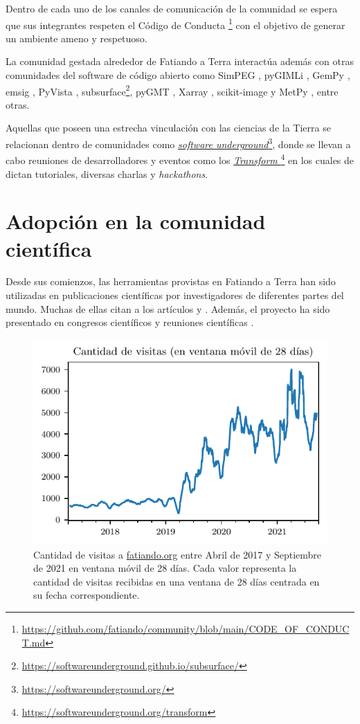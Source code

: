 Dentro de cada uno de los canales de comunicación de la comunidad se espera
que sus integrantes respeten el Código de
Conducta%
\footnote{%
    \url{https://github.com/fatiando/community/blob/main/CODE_OF_CONDUCT.md}%
}
con el objetivo de generar un ambiente ameno y respetuoso.

La comunidad gestada alrededor de Fatiando a Terra interactúa además con otras
comunidades del software de código abierto como SimPEG \citep{cockett2015},
pyGIMLi \citep{ruecker2017}, GemPy \citep{varga2019}, emsig
\citep{werthmuller2017,werthmuller2019}, PyVista \citep{sullivan2019},
subsurface\footnote{\url{https://softwareunderground.github.io/subsurface/}},
pyGMT \citep{pygmt2020}, Xarray \citep{xarray2017}, scikit-image
\citep{skimage} y MetPy \citep{metpy}, entre otras.

Aquellas que poseen una estrecha vinculación con las ciencias de la Tierra
se relacionan dentro de comunidades como
\href{https://softwareunderground.org/}{\emph{software
underground}}\footnote{\url{https://softwareunderground.org/}}, donde se
llevan a cabo reuniones de desarrolladores y eventos como los
\href{%
    https://softwareunderground.org/transform
}{%
    \emph{Transform}
}\footnote{\url{https://softwareunderground.org/transform}} en los cuales de
dictan tutoriales, diversas charlas y \emph{hackathons}.


\section{Adopción en la comunidad científica}

Desde sus comienzos, las herramientas provistas en Fatiando a Terra han sido
utilizadas en publicaciones científicas por investigadores de diferentes partes
del mundo.
Muchas de ellas citan a los artículos \citet{uieda2013} y \citet{verde2018}.
Además, el proyecto ha sido presentado en congresos científicos y reuniones
científicas \citep{uieda2013,uieda2020b,soler2021c}.

\begin{figure}[bh!]
    \centering
    \includegraphics[width=0.7\linewidth]{figs/fatiando/users_history.pdf}
    \caption{
        Cantidad de visitas a \href{https://fatiando.org}{fatiando.org} entre
        Abril de 2017 y Septiembre de 2021 en ventana móvil de 28 días.
        Cada valor representa la cantidad de visitas recibidas en una ventana
        de 28 días centrada en su fecha correspondiente.
    }
    \label{fig:fatiando-users-history}
\end{figure}

